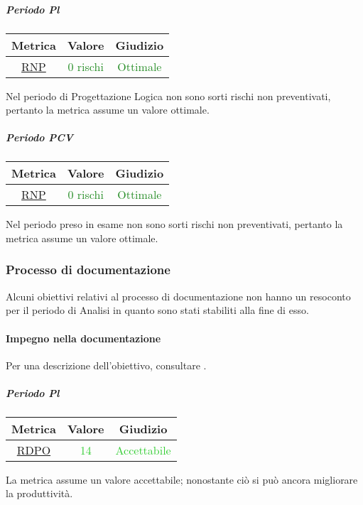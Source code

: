 				\subparagraph{Periodo Pl}
				
				\begin{table}[H]
					\centering
					\begin{tabular}{  c | c | c}
						\hline
						\textbf{Metrica} & \textbf{Valore} & \textbf{Giudizio} \\
						\hline
						\hyperref[MRDB]{RNP}    & \textcolor{ForestGreen}{0 rischi}      & \textcolor{ForestGreen}{Ottimale}  \\\hline
					\end{tabular}
				\end{table}
					Nel periodo di Progettazione Logica non sono sorti rischi non preventivati, pertanto la metrica assume un valore ottimale.
					
					\subparagraph{Periodo PCV}
					
					\begin{table}[H]
						\centering
						\begin{tabular}{  c | c | c}
							\hline
							\textbf{Metrica} & \textbf{Valore} & \textbf{Giudizio} \\
							\hline
							\hyperref[MRDB]{RNP}    & \textcolor{ForestGreen}{0 rischi}      & \textcolor{ForestGreen}{Ottimale}  \\\hline
						\end{tabular}
					\end{table}
					Nel periodo preso in esame non sono sorti rischi non preventivati, pertanto la metrica assume un valore ottimale.
					\newpage
					
		\subsubsection{Processo di documentazione}
			Alcuni obiettivi relativi al processo di documentazione non hanno un resoconto per il periodo di Analisi in quanto sono stati stabiliti alla fine di esso.
			
			\paragraph{Impegno nella documentazione}
				Per una descrizione dell'obiettivo, consultare .
				\subparagraph{Periodo Pl}
				\begin{table}[H]
					\centering
					\begin{tabular}{  c | c | c}
						\hline
						\textbf{Metrica} & \textbf{Valore} & \textbf{Giudizio} \\
						\hline
						 \hyperref[MMC]{RDPO}   & \textcolor{LimeGreen}{14}          & \textcolor{LimeGreen}{Accettabile} \\ \hline
					\end{tabular}
				\end{table}
					La metrica assume un valore accettabile; nonostante ciò si può ancora migliorare la produttività.
					
